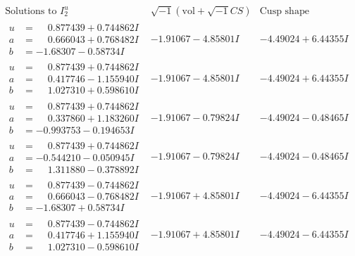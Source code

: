 \documentclass[1p]{elsarticle_modified}
\theoremstyle{definition}
\newcommand{\I}{\sqrt{-1}}
\begin{document}
$$\begin{array}{c|c|c}  
\text{Solutions to }I^u_{2}& \I (\text{vol} + \sqrt{-1}CS) & \text{Cusp shape}\\
 \hline 
\begin{aligned}
u &= \phantom{-}0.877439 + 0.744862 I \\
a &= \phantom{-}0.666043 + 0.768482 I \\
b &= -1.68307 - 0.58734 I\end{aligned}
 & -1.91067 - 4.85801 I & -4.49024 + 6.44355 I \\ \hline\begin{aligned}
u &= \phantom{-}0.877439 + 0.744862 I \\
a &= \phantom{-}0.417746 - 1.155940 I \\
b &= \phantom{-}1.027310 + 0.598610 I\end{aligned}
 & -1.91067 - 4.85801 I & -4.49024 + 6.44355 I \\ \hline\begin{aligned}
u &= \phantom{-}0.877439 + 0.744862 I \\
a &= \phantom{-}0.337860 + 1.183260 I \\
b &= -0.993753 - 0.194653 I\end{aligned}
 & -1.91067 - 0.79824 I & -4.49024 - 0.48465 I \\ \hline\begin{aligned}
u &= \phantom{-}0.877439 + 0.744862 I \\
a &= -0.544210 - 0.050945 I \\
b &= \phantom{-}1.311880 - 0.378892 I\end{aligned}
 & -1.91067 - 0.79824 I & -4.49024 - 0.48465 I \\ \hline\begin{aligned}
u &= \phantom{-}0.877439 - 0.744862 I \\
a &= \phantom{-}0.666043 - 0.768482 I \\
b &= -1.68307 + 0.58734 I\end{aligned}
 & -1.91067 + 4.85801 I & -4.49024 - 6.44355 I \\ \hline\begin{aligned}
u &= \phantom{-}0.877439 - 0.744862 I \\
a &= \phantom{-}0.417746 + 1.155940 I \\
b &= \phantom{-}1.027310 - 0.598610 I\end{aligned}
 & -1.91067 + 4.85801 I & -4.49024 - 6.44355 I \\ \hline\begin{aligned}

\end{aligned}
\end{array}$$
\end{document}
